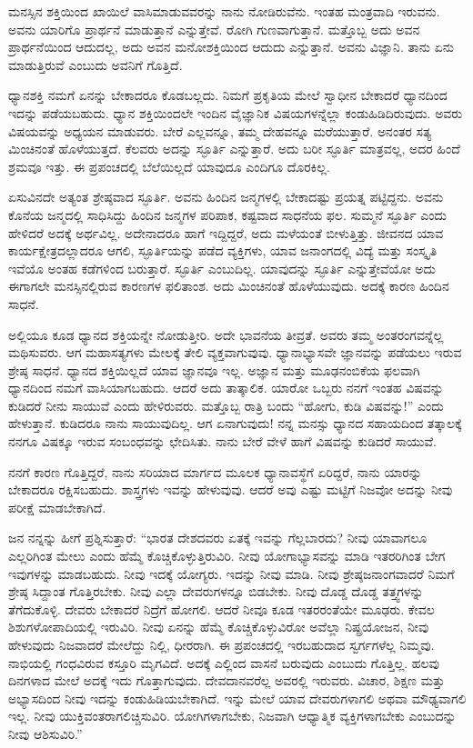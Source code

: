 ಮನಸ್ಸಿನ ಶಕ್ತಿಯಿಂದ ಖಾಯಿಲೆ ವಾಸಿಮಾಡುವವರನ್ನು ನಾನು ನೋಡಿರುವೆನು. ಇಂತಹ ಮಂತ್ರವಾದಿ ಇರುವನು. ಅವನು ಯಾರಿಗೊ ಪ್ರಾರ್ಥನೆ ಮಾಡುತ್ತಾನೆ ಎನ್ನುತ್ತೇವೆ. ರೋಗಿ ಗುಣವಾಗುತ್ತಾನೆ. ಮತ್ತೊಬ್ಬ ಅದು ಅವನ ಪ್ರಾರ್ಥನೆಯಿಂದ ಆದುದಲ್ಲ, ಅದು ಅವನ ಮನೋಶಕ್ತಿಯಿಂದ ಆದುದು ಎನ್ನುತ್ತಾನೆ. ಅವನು ವಿಜ್ಞಾನಿ. ತಾನು ಏನು ಮಾಡುತ್ತಿರುವೆ ಎಂಬುದು ಅವನಿಗೆ ಗೊತ್ತಿದೆ.

\newpage

ಧ್ಯಾನಶಕ್ತಿ ನಮಗೆ ಏನನ್ನು ಬೇಕಾದರೂ ಕೊಡಬಲ್ಲದು. ನಿಮಗೆ ಪ್ರಕೃತಿಯ ಮೇಲೆ ಸ್ವಾಧೀನ ಬೇಕಾದರೆ ಧ್ಯಾನದಿಂದ ಇದನ್ನು ಪಡೆಯಬಹುದು. ಧ್ಯಾನ ಶಕ್ತಿಯಿಂದಲೇ ಇಂದಿನ ವೈಜ್ಞಾನಿಕ ವಿಷಯಗಳನ್ನೆಲ್ಲಾ ಕಂಡುಹಿಡಿದಿರುವುದು. ಅವರು ವಿಷಯವನ್ನು ಅಧ್ಯಯನ ಮಾಡುವರು. ಬೇರೆ ಎಲ್ಲವನ್ನೂ, ತಮ್ಮ ದೇಹವನ್ನೂ ಮರೆಯುತ್ತಾರೆ. ಅನಂತರ ಸತ್ಯ ಮಿಂಚಿನಂತೆ ಹೊಳೆಯುತ್ತದೆ. ಕೆಲವರು ಅದನ್ನು ಸ್ಫೂರ್ತಿ ಎನ್ನುತ್ತಾರೆ. ಅದು ಬರೀ ಸ್ಫೂರ್ತಿ ಮಾತ್ರವಲ್ಲ, ಅದರ ಹಿಂದೆ ಶ್ರಮವೂ ಇತ್ತು. ಈ ಪ್ರಪಂಚದಲ್ಲಿ ಬೆಲೆಯಿಲ್ಲದೆ ಯಾವುದೂ ಎಂದಿಗೂ ದೊರಕಿಲ್ಲ.

ಏಸುವಿನದೇ ಅತ್ಯಂತ ಶ್ರೇಷ್ಠವಾದ ಸ್ಫೂರ್ತಿ. ಅವನು ಹಿಂದಿನ ಜನ್ಮಗಳಲ್ಲಿ ಬೇಕಾದಷ್ಟು ಪ್ರಯತ್ನ ಪಟ್ಟಿದ್ದನು. ಅವನು ಕೊನೆಯ ಜನ್ಮದಲ್ಲಿ ಸಾಧಿಸಿದ್ದು ಹಿಂದಿನ ಜನ್ಮಗಳ ಪರಿಪಾಕ, ಕಷ್ಟವಾದ ಸಾಧನೆಯ ಫಲ. ಸುಮ್ಮನೆ ಸ್ಫೂರ್ತಿ ಎಂದು ಹೇಳಿದರೆ ಅದಕ್ಕೆ ಅರ್ಥವಿಲ್ಲ. ಅದೇನಾದರೂ ಹಾಗೆ ಇದ್ದಿದ್ದರೆ, ಅದು ಮಳೆಯಂತೆ ಬೀಳುತ್ತಿತ್ತು. ಜೀವನದ ಯಾವ ಕಾರ್ಯಕ್ಷೇತ್ರದಲ್ಲಾದರೂ ಆಗಲಿ, ಸ್ಫೂರ್ತಿಯನ್ನು ಪಡೆದ ವ್ಯಕ್ತಿಗಳು, ಯಾವ ಜನಾಂಗದಲ್ಲಿ ವಿದ್ಯೆ ಮತ್ತು ಸಂಸ್ಕೃತಿ ಇವೆಯೊ ಅಂತಹ ಕಡೆಗಳಿಂದ ಬರುತ್ತಾರೆ. ಸ್ಫೂರ್ತಿ ಎಂಬುದಿಲ್ಲ. ಯಾವುದನ್ನು ಸ್ಫೂರ್ತಿ ಎನ್ನುತ್ತೇವೆಯೋ ಅದು ಈಗಾಗಲೇ ಮನಸ್ಸಿನಲ್ಲಿರುವ ಕಾರಣಗಳ ಫಲಿತಾಂಶ. ಅದು ಮಿಂಚಿನಂತೆ ಹೊಳೆಯುವುದು. ಅದಕ್ಕೆ ಕಾರಣ ಹಿಂದಿನ ಸಾಧನೆ.

ಅಲ್ಲಿಯೂ ಕೂಡ ಧ್ಯಾನದ ಶಕ್ತಿಯನ್ನೇ ನೋಡುತ್ತೀರಿ. ಅದೇ ಭಾವನೆಯ ತೀವ್ರತೆ. ಅವರು ತಮ್ಮ ಅಂತರಂಗವನ್ನೆಲ್ಲ ಮಥಿಸುವರು. ಆಗ ಮಹಾಸತ್ಯಗಳು ಮೇಲಕ್ಕೆ ತೇಲಿ ವ್ಯಕ್ತವಾಗುವುವು. ಧ್ಯಾನಾಭ್ಯಾಸವೇ ಜ್ಞಾನವನ್ನು ಪಡೆಯಲು ಇರುವ ಶ್ರೇಷ್ಠ ಸಾಧನೆ. ಧ್ಯಾನದ ಶಕ್ತಿಯಿಲ್ಲದೆ ಯಾವ ಜ್ಞಾನವೂ ಇಲ್ಲ. ಅಜ್ಞಾನ ಮತ್ತು ಮೂಢನಂಬಿಕೆಯ ಫಲವಾಗಿ ಧ್ಯಾನದಿಂದ ನಮಗೆ ವಾಸಿಯಾಗಬಹುದು. ಆದರೆ ಅದು ತಾತ್ಕಾಲಿಕ. ಯಾರೋ ಒಬ್ಬರು ನನಗೆ ಇಂತಹ ವಿಷವನ್ನು ಕುಡಿದರೆ ನೀನು ಸಾಯುವೆ ಎಂದು ಹೇಳಿರುವರು. ಮತ್ತೊಬ್ಬ ರಾತ್ರಿ ಬಂದು “ಹೋಗು, ಕುಡಿ ವಿಷವನ್ನು!'' ಎಂದು ಹೇಳುತ್ತಾನೆ. ಕುಡಿದರೂ ನಾನು ಸಾಯುವುದಿಲ್ಲ. ಆಗ ಏನಾಗುವುದು! ನನ್ನ ಮನಸ್ಸು ಧ್ಯಾನದ ಸಹಾಯದಿಂದ ತತ್ಕಾಲಕ್ಕೆ ನನಗೂ ವಿಷಕ್ಕೂ ಇರುವ ಸಂಬಂಧವನ್ನು ಛೇದಿಸಿತು. ನಾನು ಬೇರೆ ವೇಳೆ ಹಾಗೆ ವಿಷವನ್ನು ಕುಡಿದರೆ ಸಾಯುವೆ.

ನನಗೆ ಕಾರಣ ಗೊತ್ತಿದ್ದರೆ, ನಾನು ಸರಿಯಾದ ಮಾರ್ಗದ ಮೂಲಕ ಧ್ಯಾನಾವಸ್ಥೆಗೆ ಏರಿದ್ದರೆ, ನಾನು ಯಾರನ್ನು ಬೇಕಾದರೂ ರಕ್ಷಿಸಬಹುದು. ಶಾಸ್ತ್ರಗಳು ಇವನ್ನು ಹೇಳುವುವು. ಆದರೆ ಅವು ಎಷ್ಟು ಮಟ್ಟಿಗೆ ನಿಜವೋ ಅದನ್ನು ನೀವು ಪರೀಕ್ಷೆ ಮಾಡಬೇಕಾಗಿದೆ.

ಜನ ನನ್ನನ್ನು ಹೀಗೆ ಪ್ರಶ್ನಿಸುತ್ತಾರೆ: “ಭಾರತ ದೇಶದವರು ಏತಕ್ಕೆ ಇವನ್ನು ಗೆಲ್ಲಬಾರದು? ನೀವು ಯಾವಾಗಲೂ ಎಲ್ಲರಿಗಿಂತ ಮೇಲು ಎಂದು ಹೆಮ್ಮೆ ಕೊಚ್ಚಿಕೊಳ್ಳುತ್ತಿರುವಿರಿ. ನೀವು ಯೋಗಾಭ್ಯಾಸವನ್ನು ಮಾಡಿ ಇತರರಿಗಿಂತ ಬೇಗ ಇವುಗಳನ್ನು ಮಾಡಬಹುದು. ನೀವು ಇದಕ್ಕೆ ಯೋಗ್ಯರು. ಇದನ್ನು ನೀವು ಮಾಡಿ. ನೀವು ಶ್ರೇಷ್ಠ\break ಜನಾಂಗವಾದರೆ ನಿಮಗೆ ಶ್ರೇಷ್ಠ ಸಿದ್ದಾಂತ ಗೊತ್ತಿರಬೇಕು. ನೀವು ಎಲ್ಲಾ ದೇವರುಗಳನ್ನೂ ಬಿಡಬೇಕು. ನೀವು ದೊಡ್ಡ ದೊಡ್ಡ ತತ್ತ್ವಗಳನ್ನು ತೆಗೆದುಕೊಳ್ಳಿ. ದೇವರು ಬೇಕಾದರೆ ನಿದ್ರೆಗೆ ಹೋಗಲಿ. ಆದರೆ ನೀವೂ ಕೂಡ ಇತರರಂತೆಯೇ ಮೂಢರು. ಕೇವಲ ಶಿಶುಗಳೋಪಾದಿಯಲ್ಲಿ ಇರುವಿರಿ. ನೀವು ಏನನ್ನು ಹೆಮ್ಮೆ ಕೊಚ್ಚಿಕೊಳ್ಳುವಿರೋ ಅವೆಲ್ಲಾ ನಿಷ್ಪ್ರಯೋಜನ, ನೀವು ಹೇಳುವುದು ನಿಜವಾದರೆ ಮೇಲೆದ್ದು ನಿಲ್ಲಿ, ಧೀರರಾಗಿ. ಈ ಪ್ರಪಂಚದಲ್ಲಿ ಇರಬಹುದಾದ ಸ್ವರ್ಗಗಳೆಲ್ಲ ನಿಮ್ಮವು. ನಾಭಿಯಲ್ಲಿ ಗಂಧವಿರುವ ಕಸ್ತೂರಿ ಮೃಗವಿದೆ. ಅದಕ್ಕೆ ಎಲ್ಲಿಂದ ವಾಸನೆ ಬರುವುದು ಎಂಬುದು ಗೊತ್ತಿಲ್ಲ. ಹಲವು ದಿನಗಳಾದ ಮೇಲೆ ಅದಕ್ಕೆ ಇದು ಗೊತ್ತಾಗುವುದು. ದೇವದಾನವರೆಲ್ಲ ಅವರಲ್ಲಿ ಇರುವರು. ವಿಚಾರ, ಶಿಕ್ಷಣ ಮತ್ತು ಅಭ್ಯಾಸದಿಂದ ನೀವು ಇದನ್ನು ಕಂಡುಹಿಡಿಯಬೇಕಾಗಿದೆ. ಇನ್ನು ಮೇಲೆ ಯಾವ ದೇವರುಗಳಾಗಲಿ ಅಥವಾ ಮೌಢ್ಯವಾಗಲಿ ಇಲ್ಲ. ನೀವು ಯುಕ್ತಿವಂತರಾಗಲಿಚ್ಚಿಸುವಿರಿ. ಯೋಗಿಗಳಾಗಬೇಕು, ನಿಜವಾಗಿ ಆಧ್ಯಾತ್ಮಿಕ ವ್ಯಕ್ತಿಗಳಾಗಬೇಕು ಎಂಬುದನ್ನು ನೀವು ಆಶಿಸುವಿರಿ.”

